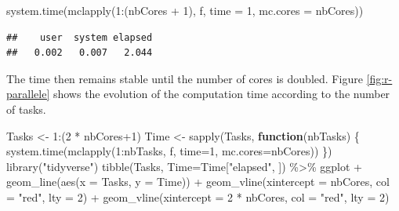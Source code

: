 \documentclass[
  12pt,
  american,
  a4paper,
  extrafontsizes,onecolumn,openright
  ]{memoir}
\newenvironment{Shaded}{\begin{snugshade}}{\end{snugshade}}
\newcommand{\AttributeTok}[1]{\textcolor[rgb]{0.77,0.63,0.00}{#1}}
\newcommand{\ControlFlowTok}[1]{\textcolor[rgb]{0.13,0.29,0.53}{\textbf{#1}}}
\newcommand{\DecValTok}[1]{\textcolor[rgb]{0.00,0.00,0.81}{#1}}
\newcommand{\FunctionTok}[1]{\textcolor[rgb]{0.00,0.00,0.00}{#1}}
\newcommand{\NormalTok}[1]{#1}
\newcommand{\OtherTok}[1]{\textcolor[rgb]{0.56,0.35,0.01}{#1}}
\newcommand{\SpecialCharTok}[1]{\textcolor[rgb]{0.00,0.00,0.00}{#1}}
\newcommand{\StringTok}[1]{\textcolor[rgb]{0.31,0.60,0.02}{#1}}
\begin{document}
\begin{Shaded}
\begin{Highlighting}[]
\FunctionTok{system.time}\NormalTok{(}\FunctionTok{mclapply}\NormalTok{(}\DecValTok{1}\SpecialCharTok{:}\NormalTok{(nbCores }\SpecialCharTok{+} \DecValTok{1}\NormalTok{), f, }\AttributeTok{time =} \DecValTok{1}\NormalTok{, }\AttributeTok{mc.cores =}\NormalTok{ nbCores))}
\end{Highlighting}
\end{Shaded}

\begin{verbatim}
##    user  system elapsed 
##   0.002   0.007   2.044
\end{verbatim}

\normalsize

The time then remains stable until the number of cores is doubled.
Figure \ref{fig:r-parallele} shows the evolution of the computation time according to the number of tasks.



\scriptsize

\begin{Shaded}
\begin{Highlighting}[]
\NormalTok{Tasks }\OtherTok{\textless{}{-}} \DecValTok{1}\SpecialCharTok{:}\NormalTok{(}\DecValTok{2} \SpecialCharTok{*}\NormalTok{ nbCores}\SpecialCharTok{+}\DecValTok{1}\NormalTok{)}
\NormalTok{Time }\OtherTok{\textless{}{-}} \FunctionTok{sapply}\NormalTok{(Tasks, }\ControlFlowTok{function}\NormalTok{(nbTasks) \{}
      \FunctionTok{system.time}\NormalTok{(}\FunctionTok{mclapply}\NormalTok{(}\DecValTok{1}\SpecialCharTok{:}\NormalTok{nbTasks, f, }\AttributeTok{time=}\DecValTok{1}\NormalTok{, }\AttributeTok{mc.cores=}\NormalTok{nbCores))}
\NormalTok{              \})}
\FunctionTok{library}\NormalTok{(}\StringTok{"tidyverse"}\NormalTok{)}
\FunctionTok{tibble}\NormalTok{(Tasks, }\AttributeTok{Time=}\NormalTok{Time[}\StringTok{"elapsed"}\NormalTok{, ]) }\SpecialCharTok{\%\textgreater{}\%} 
\NormalTok{  ggplot }\SpecialCharTok{+}
  \FunctionTok{geom\_line}\NormalTok{(}\FunctionTok{aes}\NormalTok{(}\AttributeTok{x =}\NormalTok{ Tasks, }\AttributeTok{y =}\NormalTok{ Time)) }\SpecialCharTok{+}
  \FunctionTok{geom\_vline}\NormalTok{(}\AttributeTok{xintercept =}\NormalTok{ nbCores, }\AttributeTok{col =} \StringTok{"red"}\NormalTok{, }\AttributeTok{lty =} \DecValTok{2}\NormalTok{) }\SpecialCharTok{+}
  \FunctionTok{geom\_vline}\NormalTok{(}\AttributeTok{xintercept =} \DecValTok{2} \SpecialCharTok{*}\NormalTok{ nbCores, }\AttributeTok{col =} \StringTok{"red"}\NormalTok{, }\AttributeTok{lty =} \DecValTok{2}\NormalTok{)}
\end{Highlighting}
\end{Shaded}
\end{document}

